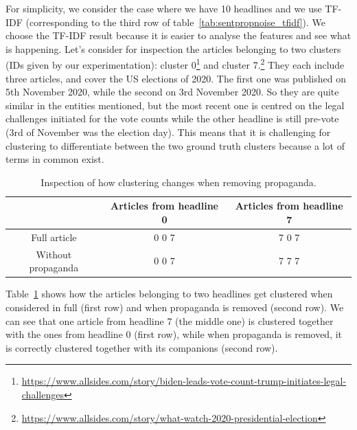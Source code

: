 For simplicity, we consider the case where we have 10 headlines and we use TF-IDF (corresponding to the third row of table~\ref{tab:sentpropnoise_tfidf}). We choose the TF-IDF result because it is easier to analyse the features and see what is happening.
Let’s consider for inspection the articles belonging to two clusters (IDs given by our experimentation): cluster 0\footnote{\url{https://www.allsides.com/story/biden-leads-vote-count-trump-initiates-legal-challenges}} and cluster 7.\footnote{\url{https://www.allsides.com/story/what-watch-2020-presidential-election}}
They each include three articles, and cover the US elections of 2020. The first one was published on 5th November 2020, while the second on 3rd November 2020. So they are quite similar in the entities mentioned, but the most recent one is centred on the legal challenges initiated for the vote counts while the other headline is still pre-vote (3rd of November was the election day). This means that it is challenging for clustering to differentiate between the two ground truth clusters because a lot of terms in common exist.

\begin{table}[!htbp]
    \centering
    \begin{tabular}{c|c|c}
         & Articles from headline 0 & Articles from headline 7 \\
         \hline
        Full article & 0 0 7 & 7 0 7 \\
        Without propaganda & 0 0 7 & 7 7 7
    \end{tabular}
    \caption{Inspection of how clustering changes when removing propaganda.}
    \label{tab:sentpropnoise_inspection}
\end{table}



Table~\ref{tab:sentpropnoise_inspection} shows how the articles belonging to two headlines get clustered when considered in full (first row) and when propaganda is removed (second row).
We can see that one article from headline 7 (the middle one) is clustered together with the ones from headline 0 (first row), while when propaganda is removed, it is correctly clustered together with its companions (second row).

